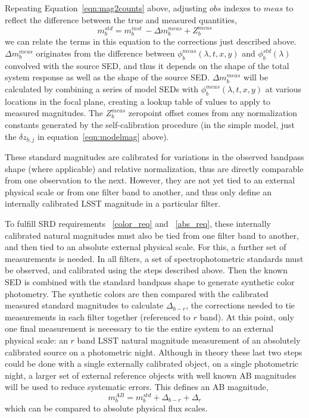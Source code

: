 \documentclass[12pt,preprint]{aastex}
\begin{document}
Repeating Equation~\ref{eqn:mag2counts} above, adjusting ${obs}$ indexes to ${meas}$ to 
reflect the difference between the true and measured quantities,
\begin{equation}
\label{eqn:magsFromCounts}
m_b^{std} = m_b^{inst} \, - \Delta m_b^{meas} + Z_b^{meas} 
\end{equation}
we can relate the terms in this equation to the corrections just
described above.  $\Delta m_b^{meas}$ originates from the difference
between $\phi_b^{meas}(\lambda,t,x,y)$ and $\phi_b^{std}(\lambda)$
convolved with the source SED, and thus it depends on the shape of the total
system response as well as the shape of the source SED. $\Delta
m_b^{meas}$ will be calculated by combining a series of model SEDs
with $\phi_b^{meas}(\lambda,t,x,y)$ at various locations in the focal
plane, creating a lookup table of values to apply to measured
magnitudes.  The $Z_b^{meas}$
zeropoint offset comes from any normalization constants generated by the 
self-calibration procedure (in the simple model, just the $\delta z_{b,j}$ in
equation~\ref{eqn:modelmag} above). 

These standard magnitudes are calibrated for variations in the
observed bandpass shape (where applicable) and relative normalization,
thus are directly comparable from one observation to the
next. However, they are not yet tied to an external physical scale or
from one filter band to another, and thus only define an internally
calibrated LSST magnitude in a particular filter.

To fulfill SRD requirements ~\ref{color_req} and ~\ref{abs_req}, these
internally calibrated natural magnitudes must also be tied from one filter
band to another, and then tied to an absolute external physical scale.
For this, a further set of measurements is needed. In all filters, a
set of spectrophotometric standards must be observed, and calibrated using
the steps described above. Then the known SED is combined with
the standard bandpass shape to generate synthetic color
photometry. The synthetic colors are then compared with the
calibrated measured standard magnitudes to calculate $\Delta_{b-r}$,
the corrections needed to tie measurements in each filter together
(referenced to $r$ band).  At this point, only one final measurement
is necessary to tie the entire system to an external physical scale:
an $r$ band LSST natural magnitude measurement of an absolutely
calibrated source on a photometric night. Although in theory these
last two steps could be done with a single externally calibrated
object, on a single photometric night, a larger set of external
reference objects with well known AB magnitudes will be used to reduce
systematic errors. This defines an AB magnitude,
\begin{equation}
\label{eqn:extmags}
m_b^{AB} = m_b^{std}  + \Delta_{b-r} + \Delta_r
\end{equation}
which can be compared to absolute physical flux scales. 
\end{document}

